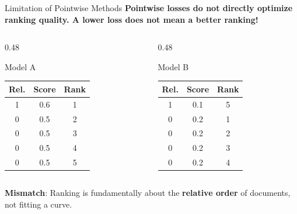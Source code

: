 \documentclass[aspectratio=169]{beamer}
\newif\ifanimated
\newcommand{\cpause}{\ifanimated\pause\fi}
\begin{document}

\begin{frame}[shrink=5]{Limitation of Pointwise Methods}
\textbf{Pointwise losses do not directly optimize ranking quality. A lower loss does not mean a better ranking!}

\vspace{0.8em}
\begin{columns}[T]
\begin{column}{0.48\textwidth}
\begin{block}{Model A}
\centering
\begin{tabular}{ccc}
\toprule
\textbf{Rel.} & \textbf{Score} & \textbf{Rank} \\
\midrule
1 & 0.6 & 1 \\
0 & 0.5 & 2 \\
0 & 0.5 & 3 \\
0 & 0.5 & 4 \\
0 & 0.5 & 5 \\
\bottomrule
\end{tabular}
\end{block}
\end{column}

\begin{column}{0.48\textwidth}
\begin{alertblock}{Model B}
\centering
\begin{tabular}{ccc}
\toprule
\textbf{Rel.} & \textbf{Score} & \textbf{Rank} \\
\midrule
1 & 0.1 & 5 \\
0 & 0.2 & 1 \\
0 & 0.2 & 2 \\
0 & 0.2 & 3 \\
0 & 0.2 & 4 \\
\bottomrule
\end{tabular}
\end{alertblock}
\end{column}
\end{columns}

\cpause
\vspace{1em}
\textbf{Mismatch}: Ranking is fundamentally about the \textbf{relative order} of documents, not fitting a curve.
\end{frame}
\end{document}
